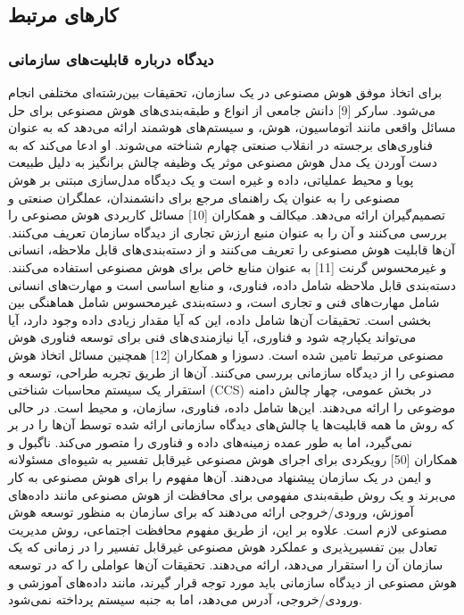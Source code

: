 \documentclass[a4paper,10pt]{article}
\begin{document}
        \subsection{کارهای مرتبط}

            \subsubsection{دیدگاه درباره قابلیت‌های سازمانی}

                برای اتخاذ موفق هوش مصنوعی در یک سازمان، تحقیقات بین‌رشته‌ای مختلفی انجام می‌شود. سارکر [9] دانش جامعی از انواع و طبقه‌بندی‌های هوش مصنوعی برای حل مسائل واقعی مانند اتوماسیون، هوش، و سیستم‌های هوشمند ارائه می‌دهد که به عنوان فناوری‌های برجسته در انقلاب صنعتی چهارم شناخته می‌شوند. او ادعا می‌کند که به دست آوردن یک مدل هوش مصنوعی موثر یک وظیفه چالش برانگیز به دلیل طبیعت پویا و محیط عملیاتی، داده و غیره است و یک دیدگاه مدل‌سازی مبتنی بر هوش مصنوعی را به عنوان یک راهنمای مرجع برای دانشمندان، عملگران صنعتی و تصمیم‌گیران ارائه می‌دهد. میکالف و همکاران [10] مسائل کاربردی هوش مصنوعی را بررسی می‌کنند و آن را به عنوان منبع ارزش تجاری از دیدگاه سازمان تعریف می‌کنند. آن‌ها قابلیت هوش مصنوعی را تعریف می‌کنند و از دسته‌بندی‌های قابل ملاحظه، انسانی و غیرمحسوس گرنت [11] به عنوان منابع خاص برای هوش مصنوعی استفاده می‌کنند. دسته‌بندی قابل ملاحظه شامل داده، فناوری، و منابع اساسی است و مهارت‌های انسانی شامل مهارت‌های فنی و تجاری است، و دسته‌بندی غیرمحسوس شامل هماهنگی بین بخشی است. تحقیقات آن‌ها شامل داده، این که آیا مقدار زیادی داده وجود دارد، آیا می‌تواند یکپارچه شود و فناوری، آیا نیازمندی‌های فنی برای توسعه فناوری هوش مصنوعی مرتبط تامین شده است. دسوزا و همکاران [12] همچنین مسائل اتخاذ هوش مصنوعی را از دیدگاه سازمانی بررسی می‌کنند. آن‌ها از طریق تجربه طراحی، توسعه و استقرار یک سیستم محاسبات شناختی (CCS) در بخش عمومی، چهار چالش دامنه موضوعی را ارائه می‌دهند. این‌ها شامل داده، فناوری، سازمان، و محیط است. در حالی که روش ما همه قابلیت‌ها یا چالش‌های دیدگاه سازمانی ارائه شده توسط آن‌ها را در بر نمی‌گیرد، اما به طور عمده زمینه‌های داده و فناوری را متصور می‌کند. ناگبول و همکاران [50] رویکردی برای اجرای هوش مصنوعی غیرقابل تفسیر به شیوه‌ای مسئولانه و ایمن در یک سازمان پیشنهاد می‌دهند. آن‌ها مفهوم را برای هوش مصنوعی به کار می‌برند و یک روش طبقه‌بندی مفهومی برای محافظت از هوش مصنوعی مانند داده‌های آموزش، ورودی/خروجی ارائه می‌دهند که برای سازمان به منظور توسعه هوش مصنوعی لازم است. علاوه بر این، از طریق مفهوم محافظت اجتماعی، روش مدیریت تعادل بین تفسیرپذیری و عملکرد هوش مصنوعی غیرقابل تفسیر را در زمانی که یک سازمان آن را استقرار می‌دهد، ارائه می‌دهند. تحقیقات آن‌ها عواملی را که در توسعه هوش مصنوعی از دیدگاه سازمانی باید مورد توجه قرار گیرند، مانند داده‌های آموزشی و ورودی/خروجی، آدرس می‌دهد، اما به جنبه سیستم پرداخته نمی‌شود.
\end{document}
